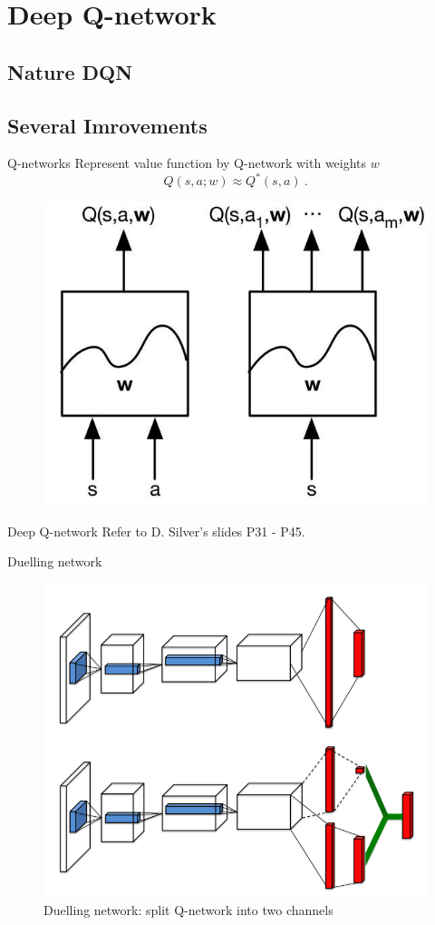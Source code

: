 \documentclass{beamer}
\newcommand{\red}[1]{{\color{red} #1}}
\begin{document}
\section{Deep Q-network}

\subsection{Nature DQN}
\subsection{Several Imrovements}

\begin{frame}{Q-networks}
	Represent value function by \red{Q-network} with weights $w$
	\begin{equation}
		Q(s,a; w) \approx Q^*(s,a) ~.
	\end{equation}
	
	\begin{figure}[t]
		\includegraphics[width=0.4\columnwidth]{figures/q-network.jpg}
	\end{figure}
\end{frame}

\begin{frame}{Deep Q-network}
Refer to D. Silver's slides P31 - P45.
\end{frame}

\begin{frame}{Duelling network}
	\begin{figure}
		\centering
		\includegraphics[width=0.65\linewidth]{figures/duel-network}
		\caption{Duelling network: split Q-network into two channels}
		\label{fig:duel-network}
	\end{figure}
\end{frame}
\end{document}
